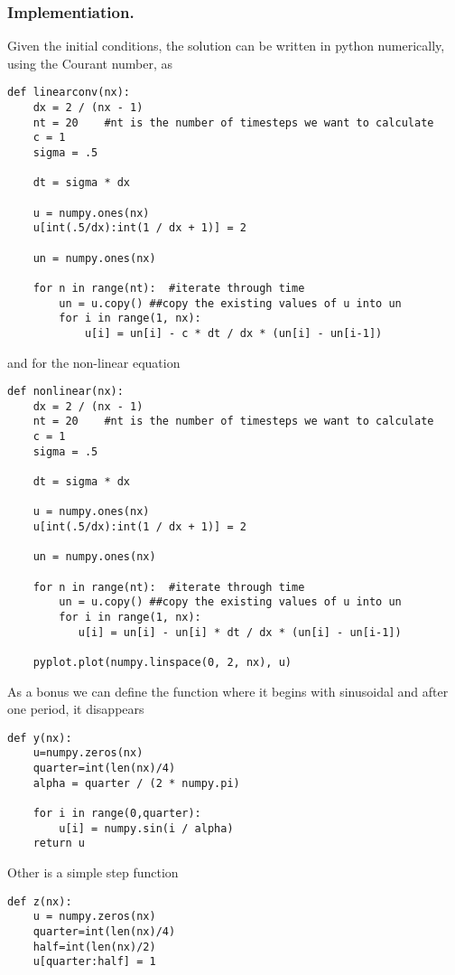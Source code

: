 \documentclass[../../../main.tex]{subfiles}
\begin{document}
\subsubsection*{Implementiation.}
Given the initial conditions, the solution can be written in python numerically, using the Courant number, as
\begin{verbatim}
def linearconv(nx):
    dx = 2 / (nx - 1)
    nt = 20    #nt is the number of timesteps we want to calculate
    c = 1
    sigma = .5
    
    dt = sigma * dx

    u = numpy.ones(nx) 
    u[int(.5/dx):int(1 / dx + 1)] = 2

    un = numpy.ones(nx)

    for n in range(nt):  #iterate through time
        un = u.copy() ##copy the existing values of u into un
        for i in range(1, nx):
            u[i] = un[i] - c * dt / dx * (un[i] - un[i-1])
\end{verbatim}
and for the non-linear equation
\begin{verbatim}
def nonlinear(nx):
    dx = 2 / (nx - 1)
    nt = 20    #nt is the number of timesteps we want to calculate
    c = 1
    sigma = .5
    
    dt = sigma * dx

    u = numpy.ones(nx) 
    u[int(.5/dx):int(1 / dx + 1)] = 2

    un = numpy.ones(nx)

    for n in range(nt):  #iterate through time
        un = u.copy() ##copy the existing values of u into un
        for i in range(1, nx):
           u[i] = un[i] - un[i] * dt / dx * (un[i] - un[i-1]) 
        
    pyplot.plot(numpy.linspace(0, 2, nx), u)
\end{verbatim}
As a bonus we can define the function where it begins with sinusoidal and after one period, it disappears
\begin{verbatim}
def y(nx):
    u=numpy.zeros(nx)
    quarter=int(len(nx)/4)
    alpha = quarter / (2 * numpy.pi) 

    for i in range(0,quarter):
        u[i] = numpy.sin(i / alpha)
    return u
\end{verbatim}
Other is a simple step function
\begin{verbatim}
def z(nx):
    u = numpy.zeros(nx) 
    quarter=int(len(nx)/4)
    half=int(len(nx)/2)
    u[quarter:half] = 1
\end{verbatim}
\end{document}
